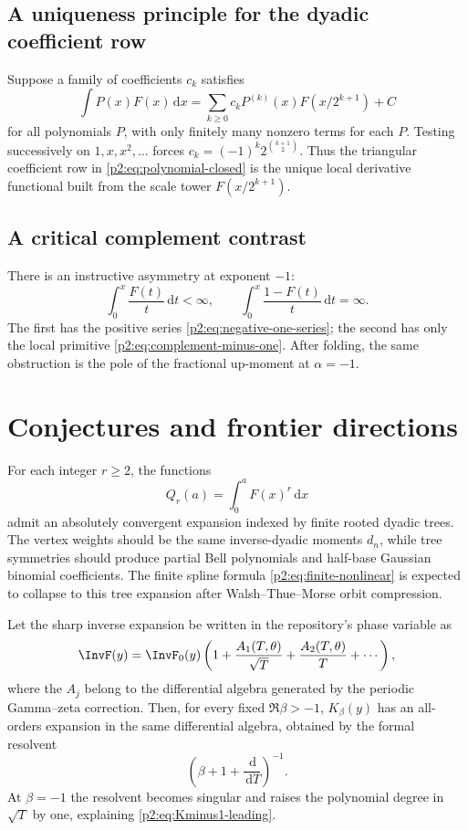 \documentclass[11pt,oneside]{article}
\theoremstyle{definition}
\theoremstyle{remark}
\newcommand{\dd}{\,\mathrm d}
\newcommand{\1}{\mathbf 1}
\begin{document}
\subsection{A uniqueness principle for the dyadic coefficient row}
Suppose a family of coefficients $c_k$ satisfies
\[
 \int P(x)F(x)\dd x=\sum_{k\ge0}c_kP^{(k)}(x)F(x/2^{k+1})+C
\]
for all polynomials $P$, with only finitely many nonzero terms for each $P$.
Testing successively on $1,x,x^2,\ldots$ forces
$c_k=(-1)^k2^{\binom{k+1}{2}}$.  Thus the triangular coefficient row in
\eqref{p2:eq:polynomial-closed} is the unique local derivative functional built
from the scale tower $F(x/2^{k+1})$.

\subsection{A critical complement contrast}
There is an instructive asymmetry at exponent $-1$:
\begin{equation}
 \int_0^x\frac{F(t)}t\dd t<\infty,
 \qquad
 \int_0^x\frac{1-F(t)}t\dd t=\infty.                      \label{p2:eq:critical-contrast}
\end{equation}
The first has the positive series \eqref{p2:eq:negative-one-series}; the second
has only the local primitive \eqref{p2:eq:complement-minus-one}.  After folding,
the same obstruction is the pole of the fractional up-moment at
$\alpha=-1$.

\section{Conjectures and frontier directions}
\label{p2:sec:conjectures}

\begin{conjecture}
\label{p2:conj:nonlinear-tree}
For each integer $r\ge2$, the functions
\[
 Q_r(a)=\int_0^aF(x)^r\dd x
\]
admit an absolutely convergent expansion indexed by finite rooted dyadic trees.
The vertex weights should be the same inverse-dyadic moments $d_n$, while tree
symmetries should produce partial Bell polynomials and half-base Gaussian
binomial coefficients.  The finite spline formula
\eqref{p2:eq:finite-nonlinear} is expected to collapse to this tree expansion
after Walsh--Thue--Morse orbit compression.
\end{conjecture}

\begin{conjecture}
\label{p2:conj:periodic-transfer}
Let the sharp inverse expansion be written in the repository's phase variable as
\[
 \InvF(y)=\InvF_0(y)\left(1+\frac{A_1(T,\theta)}{\sqrt T}
 +\frac{A_2(T,\theta)}T+\cdots\right),
\]
where the $A_j$ belong to the differential algebra generated by the periodic
Gamma--zeta correction.  Then, for every fixed $\Re\beta>-1$, $K_\beta(y)$ has
an all-orders expansion in the same differential algebra, obtained by the
formal resolvent
\[
 \left(\beta+1+\frac{\dd}{\dd T}\right)^{-1}.
\]
At $\beta=-1$ the resolvent becomes singular and raises the polynomial degree in
$\sqrt T$ by one, explaining \eqref{p2:eq:Kminus1-leading}.
\end{conjecture}
\end{document}
